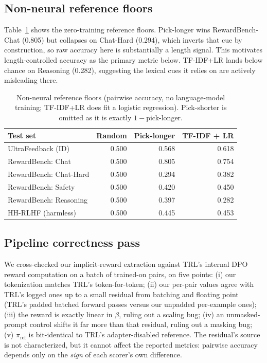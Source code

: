 \documentclass[11pt]{article}
\begin{document}
\subsection{Non-neural reference floors}
Table~\ref{tab:baselines} shows the zero-training reference floors. Pick-longer wins
RewardBench-Chat (0.805) but collapses on Chat-Hard (0.294), which inverts that cue by
construction, so raw accuracy here is substantially a length signal. This motivates
length-controlled accuracy as the primary metric below. TF-IDF+LR lands below chance on
Reasoning (0.282), suggesting the lexical cues it relies on are actively misleading there.

\begin{table}[H]
\centering
\caption{Non-neural reference floors (pairwise accuracy, no language-model training; TF-IDF+LR
does fit a logistic regression). Pick-shorter is omitted as it is exactly $1-$pick-longer.}
\label{tab:baselines}
\begin{tabular}{lrrr}
\toprule
Test set & Random & Pick-longer & TF-IDF + LR \\
\midrule
UltraFeedback (ID) & 0.500 & 0.568 & 0.618 \\
RewardBench: Chat & 0.500 & 0.805 & 0.754 \\
RewardBench: Chat-Hard & 0.500 & 0.294 & 0.382 \\
RewardBench: Safety & 0.500 & 0.420 & 0.450 \\
RewardBench: Reasoning & 0.500 & 0.397 & 0.282 \\
HH-RLHF (harmless) & 0.500 & 0.445 & 0.453 \\
\bottomrule
\end{tabular}
\end{table}

\subsection{Pipeline correctness pass}
\label{sec:pipeline-check}
We cross-checked our implicit-reward extraction against TRL's internal DPO reward computation on
a batch of trained-on pairs, on five points:
(i) our tokenization matches TRL's token-for-token;
(ii) our per-pair values agree with TRL's logged ones up to a small residual from batching and
floating point (TRL's padded batched forward passes versus our unpadded per-example ones);
(iii) the reward is exactly linear in $\beta$, ruling out a scaling bug;
(iv) an unmasked-prompt control shifts it far more than that residual, ruling out a masking bug;
(v) $\pi_{\mathrm{ref}}$ is bit-identical to TRL's adapter-disabled reference.
The residual's source is not characterized, but it cannot affect the reported metrics: pairwise
accuracy depends only on the \emph{sign} of each scorer's own difference.
\end{document}
